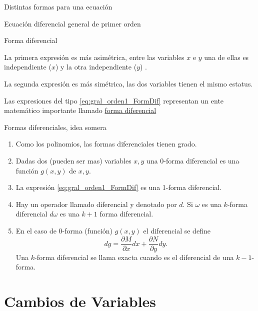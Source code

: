 \documentclass[handout,hyperref={colorlinks=true}]{beamer}
\newcommand{\nl}{\onslide<+-> }
\begin{document}
\begin{frame}{Distintas formas para una ecuación}

\nl\begin{block}{Ecuación diferencial general de primer orden} 
\end{block}

\nl\begin{block}{Forma diferencial}
\end{block}
\nl La primera expresión es más asimétrica, entre las variables $x$ e $y$ una de ellas es independiente ($x$) y la otra independiente  ($y$) . 

\nl La segunda expresión es  más simétrica, las dos variables tienen el mismo estatus.

\nl Las expresiones del tipo \eqref{eq:gral_orden1_FormDif} representan un ente matemático importante llamado \href{http://es.wikipedia.org/wiki/Forma_diferencial}{forma diferencial}


\end{frame}



\begin{frame}{Formas diferenciales, idea somera}


\begin{enumerate}
\item<+-> Como los polinomios, las formas diferenciales tienen grado. 
\item<+-> Dadas dos (pueden ser mas) variables $x,y$ una 0-forma diferencial es una función $g(x,y)$ de $x,y$. 
\item<+> La expresión \eqref{eq:gral_orden1_FormDif} es una 1-forma diferencial.
\item<+-> Hay un operador llamado diferencial y denotado por $d$. Si $\omega$ es una $k$-forma diferencial $d\omega$ es una $k+1$ forma diferencial.
\item<+-> En el caso de $0$-forma (función) $g(x,y)$ el diferencial se define
\[dg=\frac{\partial M}{\partial x}dx+ \frac{\partial N}{\partial y}dy.\]
Una $k$-forma diferencial se llama exacta cuando es el diferencial de una $k-1$-forma.
\end{enumerate}


\end{frame}


\section{Cambios de Variables}
\end{document}
